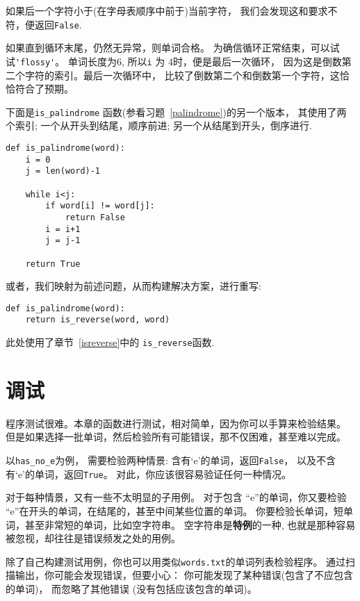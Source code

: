 \documentclass[10pt]{book}
\begin{document}
如果后一个字符小于(在字母表顺序中前于)当前字符，
我们会发现这和要求不符，便返回{\tt False}.

如果直到循环末尾，仍然无异常，则单词合格。
为确信循环正常结束，可以试试\verb"'flossy'"。
单词长度为6, 所以{\tt i} 为 4时，便是最后一次循环，
因为这是倒数第二个字符的索引。最后一次循环中，
比较了倒数第二个和倒数第一个字符，这恰恰符合了预期。

下面是\verb"is_palindrome" 函数(参看习题~\ref{palindrome})的另一个版本，
其使用了两个索引; 一个从开头到结尾，顺序前进;
另一个从结尾到开头，倒序进行.

\begin{verbatim}
def is_palindrome(word):
    i = 0
    j = len(word)-1

    while i<j:
        if word[i] != word[j]:
            return False
        i = i+1
        j = j-1

    return True
\end{verbatim}

或者，我们映射为前述问题，从而构建解决方案，进行重写:

\begin{verbatim}
def is_palindrome(word):
    return is_reverse(word, word)
\end{verbatim}
%
此处使用了章节~\ref{isreverse}中的 \verb"is_reverse"函数.


\section{调试}

程序测试很难。本章的函数进行测试，相对简单，因为你可以手算来检验结果。
但是如果选择一批单词，然后检验所有可能错误，那不仅困难，甚至难以完成。

以\verb"has_no_e"为例， 需要检验两种情景: 含有`e'的单词，返回{\tt False}，
以及不含有`e'的单词，返回{\tt True}。 对此，你应该很容易验证任何一种情况。

对于每种情景，又有一些不太明显的子用例。
对于包含 ``e''的单词，你又要检验 ``e''在开头的单词，在结尾的，甚至中间某些位置的单词。
你要检验长单词，短单词，甚至非常短的单词，比如空字符串。
空字符串是{\bf 特例}的一种, 也就是那种容易被忽视，却往往是错误频发之处的用例。

除了自己构建测试用例，你也可以用类似{\tt words.txt}的单词列表检验程序。
通过扫描输出，你可能会发现错误，但要小心：
你可能发现了某种错误(包含了不应包含的单词)， 而忽略了其他错误
(没有包括应该包含的单词)。
\end{document}
